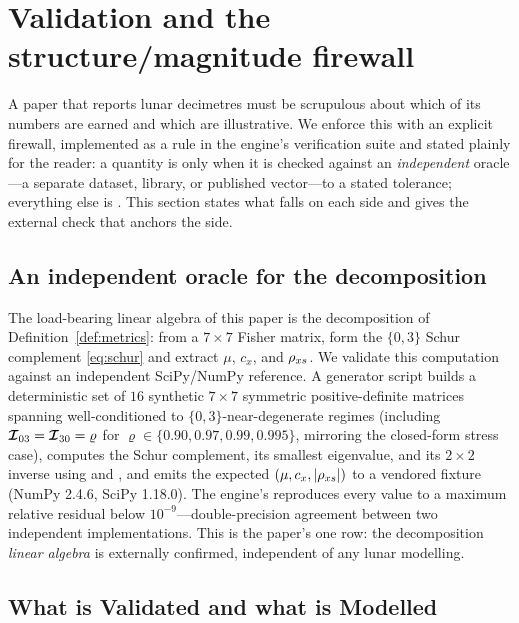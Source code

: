 \section{Validation and the structure/magnitude firewall}
\label{sec:validation}

A paper that reports lunar decimetres must be scrupulous about which of its numbers
are earned and which are illustrative. We enforce this with an explicit firewall,
implemented as a rule in the engine's verification suite and stated plainly for the
reader: a quantity is \Validated{} only when it is checked against an
\emph{independent} oracle---a separate dataset, library, or published vector---to a
stated tolerance; everything else is \Modelled{}. This section states what falls on
each side and gives the external check that anchors the \Validated{} side.

\subsection{An independent oracle for the decomposition}
\label{sec:scipy}

The load-bearing linear algebra of this paper is the decomposition of
Definition~\ref{def:metrics}: from a $7\times7$ Fisher matrix, form the
$\{0,3\}$ Schur complement \eqref{eq:schur} and extract $\mu$, $c_x$, and $\rho_{x s}$.
We validate this computation against an independent SciPy/NumPy reference. A
generator script builds a deterministic set of $16$ synthetic $7\times7$
symmetric positive-definite matrices spanning well-conditioned to
$\{0,3\}$-near-degenerate regimes (including $\bm{\mathcal{I}}_{03}=\bm{\mathcal{I}}_{30}=\varrho$
for $\varrho\in\{0.90,0.97,0.99,0.995\}$, mirroring the closed-form stress case),
computes the Schur complement, its smallest eigenvalue, and its $2\times2$ inverse
using  and , and emits the
expected $(\mu,c_x,|\rho_{x s}|)$ to a vendored fixture (NumPy 2.4.6, SciPy 1.18.0). The
engine's  reproduces every value to a maximum relative residual
below $10^{-9}$---double-precision agreement between two independent
implementations. This is the paper's one \Validated{} row: the decomposition
\emph{linear algebra} is externally confirmed, independent of any lunar modelling.

\subsection{What is Validated and what is Modelled}
\label{sec:matrix}


